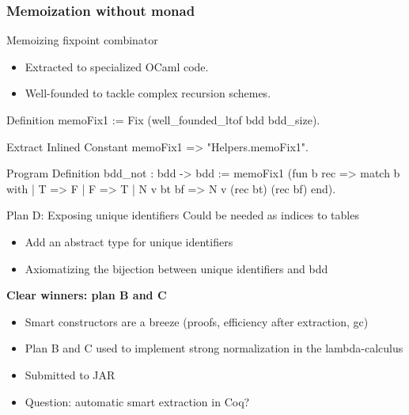 \documentclass[9pt]{beamer}
\begin{document}
\begin{frame}[fragile]
  \frametitle{Memoization without monad}
  \begin{block}{Memoizing fixpoint combinator}
    \begin{itemize}
    \item Extracted to specialized OCaml code.
    \item Well-founded to tackle complex recursion schemes.
    \end{itemize}
    \begin{coq}
Definition memoFix1 := Fix (well_founded_ltof bdd bdd_size).

Extract Inlined Constant memoFix1 => "Helpers.memoFix1".

Program Definition bdd_not : bdd -> bdd :=
  memoFix1 (fun b rec =>
          match b with
            | T => F  | F => T
            | N v bt bf => N v (rec bt) (rec bf)
          end).
    \end{coq}
  \end{block}
\end{frame}

\begin{frame}{Plan D: Exposing unique identifiers}
  Could be needed as indices to tables
  \begin{itemize}
  \item Add an abstract type for unique identifiers
  \item Axiomatizing the bijection between unique identifiers and bdd
  \end{itemize}
\end{frame}

{
  \textbf{Clear winners: plan B and C}
  \begin{itemize}
  \item Smart constructors are a breeze (proofs, efficiency after extraction, gc)
  \item Plan B and C used to implement strong normalization in the lambda-calculus
  \item Submitted to JAR
  \item Question: automatic smart extraction in Coq?
  \end{itemize}
}
\end{document}
